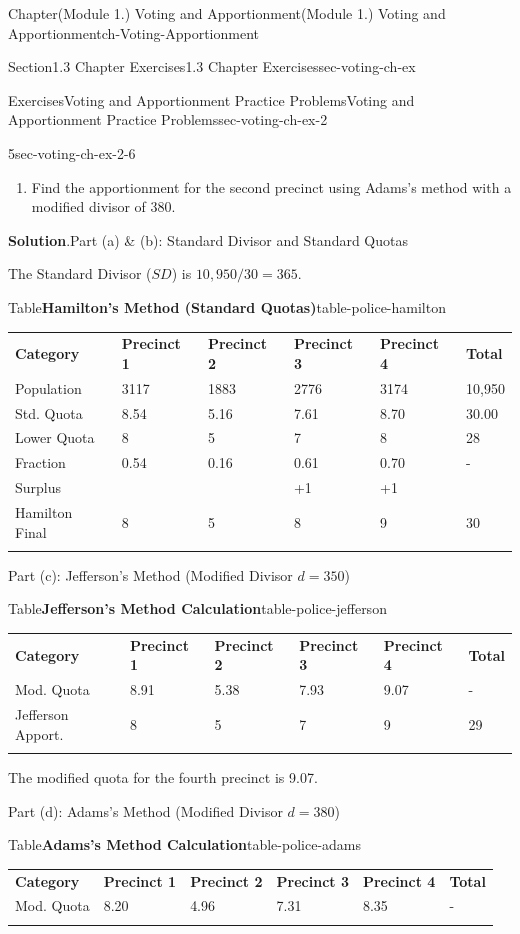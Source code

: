 \documentclass[oneside,10pt,]{book}
\newcommand{\blocktitlefont}{\relax}
\newcommand{\tabularfont}{\relax}
\newcommand{\hrulethin}  {\noalign{\hrule height 0.04em}}
\begin{document}
\begin{chapterptx}{Chapter}{(Module 1.) Voting and Apportionment}{}{(Module 1.) Voting and Apportionment}{}{}{ch-Voting-Apportionment}
\begin{sectionptx}{Section}{1.3 Chapter Exercises}{}{1.3 Chapter Exercises}{}{}{sec-voting-ch-ex}
\begin{exercises-subsection-numberless}{Exercises}{Voting and Apportionment Practice Problems}{}{Voting and Apportionment Practice Problems}{}{}{sec-voting-ch-ex-2}
\begin{divisionexercise}{5}{}{}{sec-voting-ch-ex-2-6}
\begin{enumerate}[label={(\alph*)}]
\item{}Find the apportionment for the second precinct using Adams's method with a modified divisor of 380.%
\end{enumerate}
%
\par\smallskip%
\noindent\textbf{\blocktitlefont Solution}.\hypertarget{sec-voting-ch-ex-2-6-2}{}\quad{}Part (a) \& (b): Standard Divisor and Standard Quotas%
\par
The Standard Divisor (\(SD\)) is \(10,950 / 30 = 365\).%
\begin{tableptx}{Table}{\textbf{Hamilton's Method (Standard Quotas)}}{table-police-hamilton}{}%
\centering%
{\tabularfont%
\begin{tabular}{llllll}\hrulethin
{\bfseries{}Category}&{\bfseries{}Precinct 1}&{\bfseries{}Precinct 2}&{\bfseries{}Precinct 3}&{\bfseries{}Precinct 4}&{\bfseries{}Total}\tabularnewline\hrulethin
Population&3117&1883&2776&3174&10,950\tabularnewline\hrulethin
Std. Quota&8.54&5.16&7.61&8.70&30.00\tabularnewline\hrulethin
Lower Quota&8&5&7&8&28\tabularnewline\hrulethin
Fraction&0.54&0.16&0.61&0.70&-\tabularnewline\hrulethin
Surplus&&&+1&+1&\tabularnewline\hrulethin
Hamilton Final&8&5&8&9&30\tabularnewline\hrulethin
\end{tabular}
}%
\end{tableptx}%
Part (c): Jefferson's Method (Modified Divisor \(d = 350\))%
\begin{tableptx}{Table}{\textbf{Jefferson's Method Calculation}}{table-police-jefferson}{}%
\centering%
{\tabularfont%
\begin{tabular}{llllll}\hrulethin
{\bfseries{}Category}&{\bfseries{}Precinct 1}&{\bfseries{}Precinct 2}&{\bfseries{}Precinct 3}&{\bfseries{}Precinct 4}&{\bfseries{}Total}\tabularnewline\hrulethin
Mod. Quota&8.91&5.38&7.93&9.07&-\tabularnewline\hrulethin
Jefferson Apport.&8&5&7&9&29\tabularnewline\hrulethin
\end{tabular}
}%
\end{tableptx}%
The modified quota for the fourth precinct is 9.07.%
\par
Part (d): Adams's Method (Modified Divisor \(d = 380\))%
\begin{tableptx}{Table}{\textbf{Adams's Method Calculation}}{table-police-adams}{}%
\centering%
{\tabularfont%
\begin{tabular}{llllll}\hrulethin
{\bfseries{}Category}&{\bfseries{}Precinct 1}&{\bfseries{}Precinct 2}&{\bfseries{}Precinct 3}&{\bfseries{}Precinct 4}&{\bfseries{}Total}\tabularnewline\hrulethin
Mod. Quota&8.20&4.96&7.31&8.35&-\tabularnewline\hrulethin

\end{tabular}}
\end{tableptx}
\end{divisionexercise}
\end{exercises-subsection-numberless}
\end{sectionptx}
\end{chapterptx}
\end{document}
